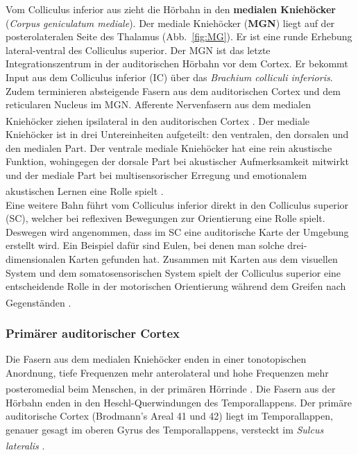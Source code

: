 \documentclass[12pt,a4paper,pdftex]{article}
\begin{document}
Vom Colliculus inferior aus zieht die Hörbahn in den \textbf{medialen Kniehöcker} (\textit{Corpus geniculatum mediale}).  Der mediale Kniehöcker (\textbf{MGN}) liegt auf der posterolateralen Seite des Thalamus (Abb.~\ref{fig:MG}). Er ist eine runde Erhebung lateral-ventral des Colliculus superior. Der MGN ist das letzte Integrationszentrum in der auditorischen Hörbahn vor dem Cortex. Er bekommt Input aus dem Colliculus inferior (IC) über das \textit{Brachium colliculi inferioris}. Zudem terminieren absteigende Fasern aus dem auditorischen Cortex und dem reticularen Nucleus im MGN. Afferente Nervenfasern aus dem medialen Kniehöcker ziehen ipsilateral in den auditorischen Cortex \textsuperscript{\cite[29]{paxinos2014rat}}. Der mediale Kniehöcker ist in drei Untereinheiten aufgeteilt: den ventralen, den dorsalen und den medialen Part. Der ventrale mediale Kniehöcker hat eine rein akustische Funktion, wohingegen der dorsale Part bei akustischer Aufmerksamkeit mitwirkt und der mediale Part bei multisensorischer Erregung und emotionalem akustischen Lernen eine Rolle spielt \textsuperscript{\cite[29]{paxinos2014rat}}. 
\\
Eine weitere Bahn führt vom Colliculus inferior direkt in den Colliculus superior (SC), welcher bei reflexiven Bewegungen zur Orientierung eine Rolle spielt. Deswegen wird angenommen, dass im SC eine auditorische Karte der Umgebung erstellt wird. Ein Beispiel dafür sind Eulen, bei denen man solche drei-dimensionalen Karten gefunden hat. Zusammen mit Karten aus dem visuellen System und dem somatosensorischen System spielt der Colliculus superior eine entscheidende Rolle in der motorischen Orientierung während dem Greifen nach Gegenständen \textsuperscript{\cite[31]{kandel2013principles}}.


\subsubsection*{Primärer auditorischer Cortex}

Die Fasern aus dem medialen Kniehöcker enden in einer tonotopischen Anordnung, tiefe Frequenzen mehr anterolateral und hohe Frequenzen mehr posteromedial beim Menschen, in der primären Hörrinde \textsuperscript{\cite[9.9]{trepel2011neuroanatomie}}. Die Fasern aus der Hörbahn enden in den Heschl-Querwindungen des Temporallappens. Der primäre auditorische Cortex (Brodmann's Areal 41 und 42) liegt im Temporallappen, genauer gesagt im oberen Gyrus des Temporallappens, versteckt im \textit{Sulcus lateralis}  \textsuperscript{\cite[13]{crossman2014neuroanatomy}}. 
\end{document}
